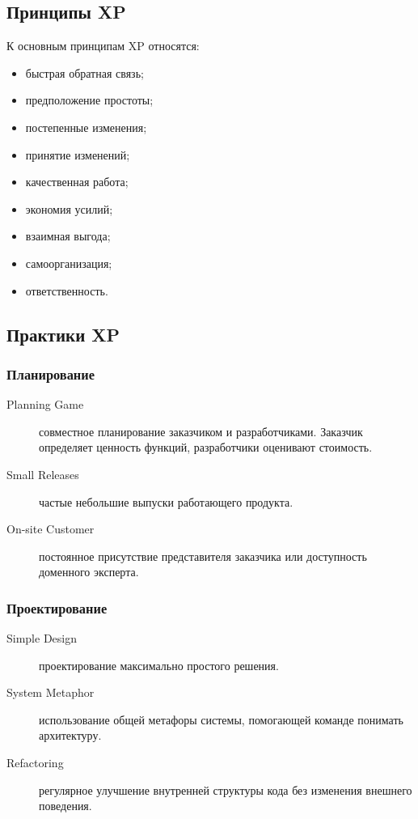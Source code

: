 \documentclass[12pt,a4paper]{article}
\begin{document}
\subsection{Принципы XP}

К основным принципам XP относятся:
\begin{itemize}
    \item быстрая обратная связь;
    \item предположение простоты;
    \item постепенные изменения;
    \item принятие изменений;
    \item качественная работа;
    \item экономия усилий;
    \item взаимная выгода;
    \item самоорганизация;
    \item ответственность.
\end{itemize}

\subsection{Практики XP}

\subsubsection{Планирование}

\begin{description}
    \item[Planning Game] совместное планирование заказчиком и разработчиками. Заказчик определяет ценность функций, разработчики оценивают стоимость.
    \item[Small Releases] частые небольшие выпуски работающего продукта.
    \item[On-site Customer] постоянное присутствие представителя заказчика или доступность доменного эксперта.
\end{description}

\subsubsection{Проектирование}

\begin{description}
    \item[Simple Design] проектирование максимально простого решения.
    \item[System Metaphor] использование общей метафоры системы, помогающей команде понимать архитектуру.
    \item[Refactoring] регулярное улучшение внутренней структуры кода без изменения внешнего поведения.
\end{description}
\end{document}
